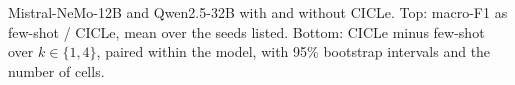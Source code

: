 \begin{table}[t]
  \centering
  \scriptsize
  \setlength{\tabcolsep}{3pt}
  \resizebox{\textwidth}{!}{}\par\medskip
  \resizebox{\textwidth}{!}{}
  \caption{Mistral-NeMo-12B and Qwen2.5-32B with and without CICLe. Top: macro-F1 as few-shot / CICLe, mean over the seeds listed. Bottom: CICLe minus few-shot over $k \in \{1, 4\}$, paired within the model, with 95\% bootstrap intervals and the number of cells.}
  \label{tab:large}
\end{table}
